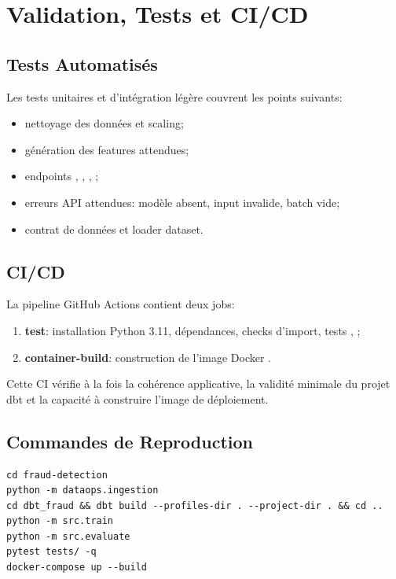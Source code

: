\chapter{Validation, Tests et CI/CD}

\section{Tests Automatisés}

Les tests unitaires et d'intégration légère couvrent les points suivants:

\begin{itemize}
    \item nettoyage des données et scaling;
    \item génération des features attendues;
    \item endpoints \repoPath{/}, , , ;
    \item erreurs API attendues: modèle absent, input invalide, batch vide;
    \item contrat de données et loader dataset.
\end{itemize}

\section{CI/CD}

La pipeline GitHub Actions  contient deux jobs:

\begin{enumerate}
    \item \textbf{test}: installation Python 3.11, dépendances, checks d'import, tests , ;
    \item \textbf{container-build}: construction de l'image Docker .
\end{enumerate}

Cette CI vérifie à la fois la cohérence applicative, la validité minimale du projet dbt et la capacité à construire l'image de déploiement.

\section{Commandes de Reproduction}

\begin{lstlisting}
cd fraud-detection
python -m dataops.ingestion
cd dbt_fraud && dbt build --profiles-dir . --project-dir . && cd ..
python -m src.train
python -m src.evaluate
pytest tests/ -q
docker-compose up --build
\end{lstlisting}

